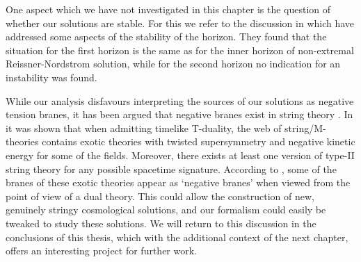 One aspect which we have not investigated in this chapter is the question of whether our solutions are stable. For this we refer to the discussion in \cite{Burgess:2002vu, Burgess:2003mk} which have addressed some aspects of the stability of the horizon. They found that the situation for the first horizon is the same as for the inner horizon of non-extremal Reissner-Nordstrom solution, while for the second horizon no indication for an instability was found. 

While our analysis disfavours interpreting the sources of our solutions as negative tension branes, it has been argued that negative branes exist in string theory \cite{Dijkgraaf:2016lym}. In \cite{Hull:1998ym} it was shown that when admitting timelike T-duality, the web of string/M-theories contains exotic theories with twisted supersymmetry and negative kinetic energy for some of the fields. Moreover, there exists at least one version of type-II string theory for any possible spacetime signature.  According to \cite{Dijkgraaf:2016lym}, some of the branes of these exotic theories appear as `negative branes' when viewed from the point of view of a dual theory. This could allow the construction of new, genuinely stringy cosmological solutions, and our formalism could easily be tweaked to study these solutions. We will return to this discussion in the conclusions of this thesis, which with the additional context of the next chapter, offers an interesting project for further work.
